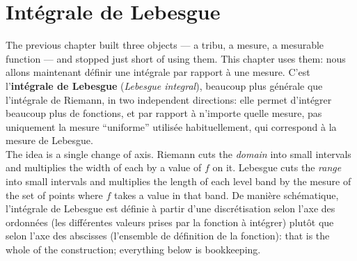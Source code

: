 \section{Intégrale de Lebesgue}

The previous chapter built three objects --- a tribu, a mesure, a mesurable
function --- and stopped just short of using them. This chapter uses them: nous
allons maintenant définir une intégrale par rapport à une mesure. C'est
l'\textbf{intégrale de Lebesgue} (\textit{Lebesgue integral}), beaucoup plus générale que l'intégrale de Riemann, in two
independent directions: elle permet d'intégrer beaucoup plus de fonctions, et par
rapport à n'importe quelle mesure, pas uniquement la mesure ``uniforme'' utilisée
habituellement, qui correspond à la mesure de Lebesgue.\\

The idea is a single change of axis. Riemann cuts the \emph{domain} into small
intervals and multiplies the width of each by a value of $f$ on it. Lebesgue cuts the
\emph{range} into small intervals and multiplies the length of each level band by the
mesure of the set of points where $f$ takes a value in that band. De manière
schématique, l'intégrale de Lebesgue est définie à partir d'une discrétisation selon
l'axe des ordonnées (les différentes valeurs prises par la fonction à intégrer)
plutôt que selon l'axe des abscisses (l'ensemble de définition de la fonction): that
is the whole of the construction; everything below is bookkeeping.

